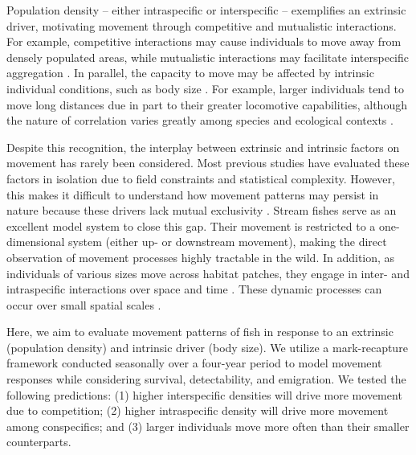 \documentclass[11pt, class=article, crop=false]{standalone}
\begin{document}
Population density – either intraspecific or interspecific – exemplifies an extrinsic driver, motivating movement through competitive and mutualistic interactions. For example, competitive interactions may cause individuals to move away from densely populated areas, while mutualistic interactions may facilitate interspecific aggregation \citep{thierryInterplayAbioticBiotic2024, rasmussenIndividualMovementStream2017}. In parallel, the capacity to move may be affected by intrinsic individual conditions, such as body size \citep{clobertDispersalEcologyEvolution2012}. For example,  larger individuals tend to move long distances due in part to their greater locomotive capabilities, although the nature of correlation varies greatly among species and ecological contexts \citep{comteEvidenceDispersalSyndromes2018, teruiParasiteInfectionInduces2017, radingerPatternsPredictorsFish2014, debeffeConditiondependentNatalDispersal2012,gilliamMovementCorridorsEnhancement2001}.

Despite this recognition, the interplay between extrinsic and intrinsic factors on movement has rarely been considered. Most previous studies have evaluated these factors in isolation due to field constraints and statistical complexity. However, this makes it difficult to understand how movement patterns may persist in nature because these drivers lack mutual exclusivity \citep{mcmahonLinkingHabitatSelection2006}. Stream fishes serve as an excellent model system to close this gap. Their movement is restricted to a one-dimensional system (either up- or downstream movement), making the direct observation of movement processes highly tractable in the wild. In addition, as individuals of various sizes move across habitat patches, they engage in inter- and intraspecific interactions over space and time \citep{brownHabitatHeterogeneityActivity2010, davidsonSeasonalSpatialHydrological2012, robinsonEffectsMultiyearExperimental2003, albaneseEcologicalCorrelatesFish2004, nakayamaFinescaleMovementEcology2018, pettyRestrictedMovementMottled2004, robertsSpatiotemporalVariabilityStream2007}. These dynamic processes can occur over small spatial scales \citep{teruiNonrandomDispersalSympatric2021}. 

Here, we aim to evaluate movement patterns of fish in response to an extrinsic (population density) and intrinsic driver (body size). We utilize a mark-recapture framework conducted seasonally over a four-year period to model movement responses while considering survival, detectability, and emigration. We tested the following predictions: (1) higher interspecific densities will drive more movement due to competition; (2) higher intraspecific density will drive more movement among conspecifics; and (3) larger individuals move more often than their smaller counterparts.
\end{document}
